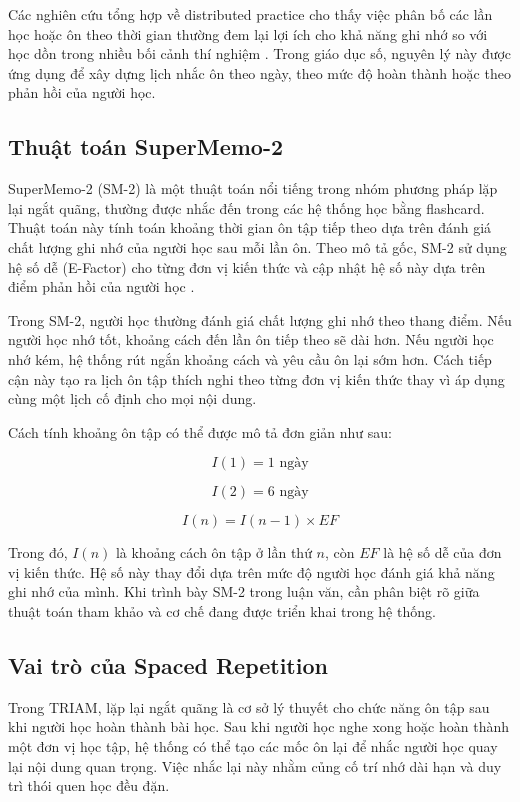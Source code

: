 \documentclass[12pt,a4paper]{report}
\begin{document}
Các nghiên cứu tổng hợp về distributed practice cho thấy việc phân bố các lần học hoặc ôn theo thời gian thường đem lại lợi ích cho khả năng ghi nhớ so với học dồn trong nhiều bối cảnh thí nghiệm \cite{cepeda2006distributedPractice}. Trong giáo dục số, nguyên lý này được ứng dụng để xây dựng lịch nhắc ôn theo ngày, theo mức độ hoàn thành hoặc theo phản hồi của người học.

\subsection{Thuật toán SuperMemo-2}

SuperMemo-2 (SM-2) là một thuật toán nổi tiếng trong nhóm phương pháp lặp lại ngắt quãng, thường được nhắc đến trong các hệ thống học bằng flashcard. Thuật toán này tính toán khoảng thời gian ôn tập tiếp theo dựa trên đánh giá chất lượng ghi nhớ của người học sau mỗi lần ôn. Theo mô tả gốc, SM-2 sử dụng hệ số dễ (E-Factor) cho từng đơn vị kiến thức và cập nhật hệ số này dựa trên điểm phản hồi của người học \cite{supermemoSm2}.

Trong SM-2, người học thường đánh giá chất lượng ghi nhớ theo thang điểm. Nếu người học nhớ tốt, khoảng cách đến lần ôn tiếp theo sẽ dài hơn. Nếu người học nhớ kém, hệ thống rút ngắn khoảng cách và yêu cầu ôn lại sớm hơn. Cách tiếp cận này tạo ra lịch ôn tập thích nghi theo từng đơn vị kiến thức thay vì áp dụng cùng một lịch cố định cho mọi nội dung.

Cách tính khoảng ôn tập có thể được mô tả đơn giản như sau:

\[
I(1) = 1 \text{ ngày}
\]

\[
I(2) = 6 \text{ ngày}
\]

\[
I(n) = I(n-1) \times EF
\]

Trong đó, \(I(n)\) là khoảng cách ôn tập ở lần thứ \(n\), còn \(EF\) là hệ số dễ của đơn vị kiến thức. Hệ số này thay đổi dựa trên mức độ người học đánh giá khả năng ghi nhớ của mình. Khi trình bày SM-2 trong luận văn, cần phân biệt rõ giữa thuật toán tham khảo và cơ chế đang được triển khai trong hệ thống.

\subsection{Vai trò của Spaced Repetition}

Trong TRIAM, lặp lại ngắt quãng là cơ sở lý thuyết cho chức năng ôn tập sau khi người học hoàn thành bài học. Sau khi người học nghe xong hoặc hoàn thành một đơn vị học tập, hệ thống có thể tạo các mốc ôn lại để nhắc người học quay lại nội dung quan trọng. Việc nhắc lại này nhằm củng cố trí nhớ dài hạn và duy trì thói quen học đều đặn.
\end{document}

